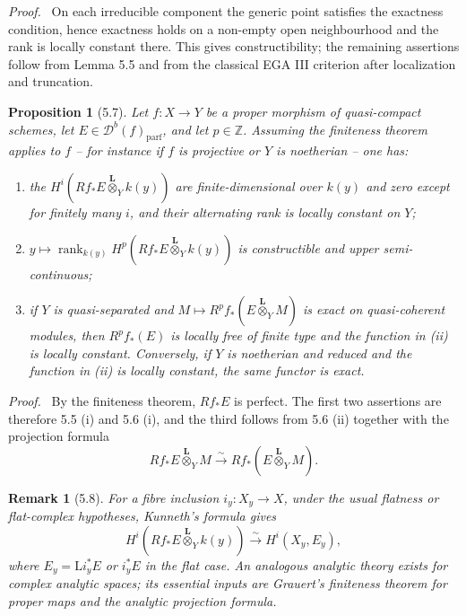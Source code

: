 \documentclass[11pt]{article}
\theoremstyle{plain}
\newtheorem*{proposition*}{Proposition}
\newtheorem*{remark*}{Remark}
\theoremstyle{definition}
\theoremstyle{remark}
\newenvironment{prooftext}{\par\noindent\textit{Proof.}\ }{\par\medskip}
\newcommand{\ZZ}{\mathbb Z}
\newcommand{\D}{\mathcal D}\newcommand{\E}{\mathcal E}\newcommand{\F}{\mathcal F}
\providecommand{\iso}{\xrightarrow{\sim}}
\providecommand{\rg}{\operatorname{rank}}
\providecommand{\Ltens}{\overset{\mathbf L}{\otimes}}
\begin{document}
\begin{prooftext}
On each irreducible component the generic point satisfies the exactness condition, hence exactness holds on a non-empty open neighbourhood and the rank is locally constant there. This gives constructibility; the remaining assertions follow from Lemma 5.5 and from the classical EGA III criterion after localization and truncation.
\end{prooftext}

\begin{proposition*}[5.7]
Let $f:X\to Y$ be a proper morphism of quasi-compact schemes, let $E\in\D^b(f)_{\mathrm{parf}}$, and let $p\in\ZZ$. Assuming the finiteness theorem applies to $f$ -- for instance if $f$ is projective or $Y$ is noetherian -- one has:
\begin{enumerate}[label=(\roman*)]
\item the $H^i(Rf_*E\Ltens_Y k(y))$ are finite-dimensional over $k(y)$ and zero except for finitely many $i$, and their alternating rank is locally constant on $Y$;
\item $y\mapsto\rg_{k(y)}H^p(Rf_*E\Ltens_Y k(y))$ is constructible and upper semi-continuous;
\item if $Y$ is quasi-separated and $M\mapsto R^pf_*(E\Ltens_Y M)$ is exact on quasi-coherent modules, then $R^pf_*(E)$ is locally free of finite type and the function in (ii) is locally constant. Conversely, if $Y$ is noetherian and reduced and the function in (ii) is locally constant, the same functor is exact.
\end{enumerate}
\end{proposition*}

\begin{prooftext}
By the finiteness theorem, $Rf_*E$ is perfect. The first two assertions are therefore 5.5 (i) and 5.6 (i), and the third follows from 5.6 (ii) together with the projection formula
\[
Rf_*E\Ltens_Y M\iso Rf_*(E\Ltens_Y M).
\]
\end{prooftext}

\begin{remark*}[5.8]
For a fibre inclusion $i_y:X_y\to X$, under the usual flatness or flat-complex hypotheses, Kunneth's formula gives
\[
H^i(Rf_*E\Ltens_Y k(y))\iso H^i(X_y,E_y),
\]
where $E_y=\mathrm L i_y^*E$ or $i_y^*E$ in the flat case. An analogous analytic theory exists for complex analytic spaces; its essential inputs are Grauert's finiteness theorem for proper maps and the analytic projection formula.
\end{remark*}
\end{document}
